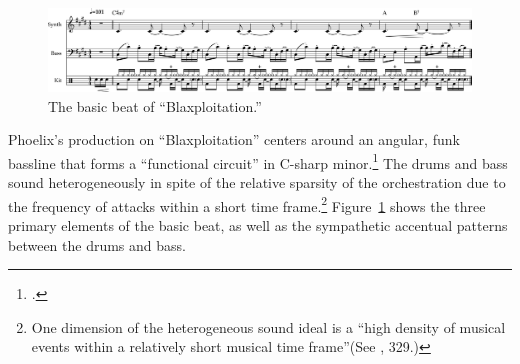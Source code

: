 \begin{figure}[h]
    \centering
    \includegraphics[width=\textwidth]{images/figures/chp 02/Figure-02.5-Blaxploitation-BB.pdf}
    \caption{The basic beat of ``Blaxploitation.''}
    \label{fig:4.1}
\end{figure}

Phoelix's production on ``Blaxploitation'' centers around an angular, funk bassline that forms a ``functional circuit'' in C-sharp minor.\footnote{\cite{kyleadamsHarmonicSyntacticMotivic2020}.} The drums and bass sound heterogeneously in spite of the relative sparsity of the orchestration due to the frequency of attacks within a short time frame.\footnote{One dimension of the heterogeneous sound ideal is a ``high density of musical events within a relatively short musical time frame''(See \cite{ollywilsonHeterogeneousSoundIdeal1992}, 329.)} Figure~\ref{fig:4.1} shows the three primary elements of the basic beat, as well as the sympathetic accentual patterns between the drums and bass.

